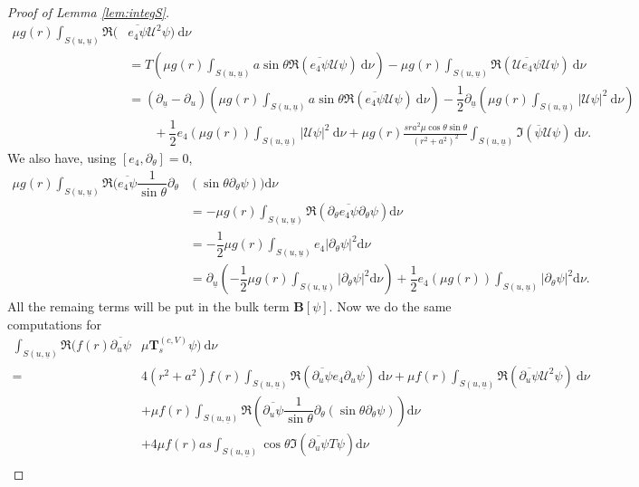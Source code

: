 \documentclass[reqno]{amsart}
\numberwithin{equation}{section}
\newcommand{\ubar}{{\underline{u}}}
\newcommand{\dee}{\mathrm{d}}
\newcommand{\teuk}{\mathbf{T}}
\theoremstyle{plain}
\theoremstyle{definition}
\theoremstyle{remark}
\numberwithin{equation}{section}
\begin{document}
\begin{proof}[Proof of Lemma \ref{lem:integS}]
\begin{align*}
    \mu g(r)\int_{{S(u,\ubar)}}\mathfrak{R}(&\overline{e_4\psi} \mathcal{U}^2\psi)\:\dee\nu\\
    &=T\left(\mu g(r)\int_{{S(u,\ubar)}}a\sin\theta\mathfrak{R}(\overline{e_4\psi}\mathcal{U}\psi)\:\dee\nu\right)-\mu g(r)\int_{{S(u,\ubar)}}\mathfrak{R}(\overline{\mathcal{U}e_4\psi} \mathcal{U}\psi)\:\dee\nu\\
    &=(\partial_\ubar-\partial_u)\left(\mu g(r)\int_{{S(u,\ubar)}}a\sin\theta\mathfrak{R}(\overline{e_4\psi}\mathcal{U}\psi)\:\dee\nu\right)-\dfrac{1}{2}\partial_\ubar\left(\mu g(r)\int_{{S(u,\ubar)}}|\mathcal{U}\psi|^2\:\dee\nu\right)\\
    &\quad\quad+\dfrac{1}{2}e_4(\mu g(r))\int_{{S(u,\ubar)}}|\mathcal{U}\psi|^2\:\dee\nu+\mu g(r)\frac{sra^2\mu\cos\theta\sin\theta}{(r^2+a^2)^2}\int_{{S(u,\ubar)}}\mathfrak{I}(\overline{\psi} \mathcal{U}\psi)\:\dee\nu.
\end{align*}
We also have, using $[e_4,\partial_\theta]=0$,
\begin{align*}
    \mu g(r)\int_{{S(u,\ubar)}}\mathfrak{R}\Bigg(\overline{e_4\psi}\dfrac{1}{\sin\theta}\partial_\theta&(\sin\theta\partial_\theta\psi)\Bigg)\dee\nu\\
    &=-\mu g(r)\int_{{S(u,\ubar)}}\mathfrak{R}\left(\partial_\theta\overline{e_4\psi}\partial_\theta\psi\right)\dee\nu\\
    &=-\dfrac{1}{2}\mu g(r)\int_{{S(u,\ubar)}}e_4|\partial_\theta\psi|^2\dee\nu\\
    &=\partial_\ubar\left(-\dfrac{1}{2}\mu g(r)\int_{{S(u,\ubar)}}|\partial_\theta\psi|^2\dee\nu\right)+\dfrac{1}{2}e_4(\mu g(r))\int_{{S(u,\ubar)}}|\partial_\theta\psi|^2\dee\nu.
\end{align*}
All the remaing terms will be put in the bulk term $\mathbf{B}[\psi]$. Now we do the same computations for 
\begin{align*}
    \int_{{S(u,\ubar)}}\mathfrak{R}(f(r)\overline{\partial_u\psi}&\mu\teuk_s^{(c,V)}\psi)\:\dee\nu\\
    =&4(r^2+a^2)f(r)\int_{{S(u,\ubar)}}\mathfrak{R}(\overline{\partial_u\psi} e_4\partial_u\psi)\:\dee\nu+\mu f(r)\int_{{S(u,\ubar)}} \mathfrak{R}(\overline{\partial_u\psi} \mathcal{U}^2\psi)\:\dee\nu\\
    &+\mu f(r)\int_{{S(u,\ubar)}}\mathfrak{R}\left(\overline{\partial_u\psi}\dfrac{1}{\sin\theta}\partial_\theta(\sin\theta\partial_\theta\psi)\right)\dee\nu\\
    &+4\mu f(r) as \int_{{S(u,\ubar)}}\cos\theta\mathfrak{I}(\overline{\partial_u\psi} T\psi)\dee\nu\\

\end{align*}
\end{proof}
\end{document}
